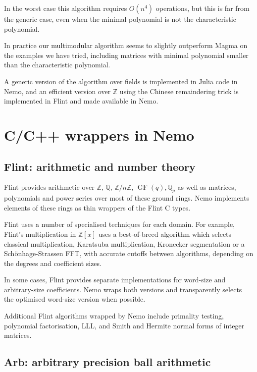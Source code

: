 \documentclass{sig-alternate-05-2015}
\begin{document}
In the worst case this algorithm requires $O(n^4)$ operations, but
this is far from the generic case, even when the minimal polynomial is not
the characteristic polynomial.

In practice our multimodular algorithm seems to slightly outperform Magma on the
examples we have tried, including matrices with minimal polynomial smaller 
than the characteristic polynomial.

A generic version of the algorithm over fields is implemented in Julia code in
Nemo, and an efficient version over $\mathbb{Z}$ using the Chinese remaindering
trick is implemented in Flint and made available in Nemo.

\section{C/C++ wrappers in Nemo}
\label{sect:wrappers}

\subsection{Flint: arithmetic and number theory}

Flint provides arithmetic over
$\mathbb{Z}$, $\mathbb{Q}$, $\mathbb{Z}/n\mathbb{Z}$,
$\operatorname{GF}(q), \mathbb{Q}_p$
as well as matrices, polynomials and power series over most
of these ground rings.
Nemo implements elements of these rings as thin wrappers of the
Flint C types.

Flint uses a number of specialised techniques for each domain.
For example, Flint's multiplication in $\mathbb{Z}[x]$
uses a best-of-breed algorithm which selects classical multiplication,
Karatsuba multiplication, Kronecker segmentation or a 
Sch\"{o}nhage-Strassen FFT, with accurate cutoffs
between algorithms, depending on the degrees and coefficient sizes.

In some cases, Flint provides separate implementations
for word-size and arbitrary-size coefficients.
Nemo wraps both versions and transparently selects the
optimised word-size version when possible.

Additional Flint algorithms wrapped by Nemo include
primality testing, polynomial factorisation, LLL, and Smith and Hermite
normal forms of integer matrices.

\subsection{Arb: arbitrary precision ball arithmetic}
\end{document}
